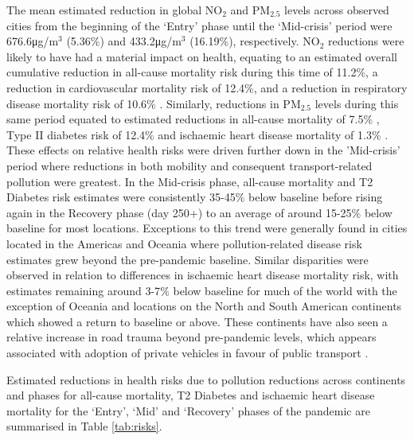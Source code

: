 \documentclass[preprint,12pt]{elsarticle}
\begin{document}
The mean estimated reduction in global NO$_{2}$ and PM$_{2.5}$ levels across observed cities from the beginning of the `Entry' phase until the `Mid-crisis' period were 676.6\si{\micro\gram}/m$^{3}$ (5.36\%) and 433.2\si{\micro\gram}/m$^{3}$ (16.19\%), respectively. NO$_{2}$ reductions were likely to have had a material impact on health, equating to an estimated overall cumulative reduction in all-cause mortality risk during this time of 11.2\%, a reduction in cardiovascular mortality risk of 12.4\%, and a reduction in respiratory disease mortality risk of 10.6\% \cite{Huang19Pollution}. Similarly, reductions in PM$_{2.5}$ levels during this same period equated to estimated reductions in all-cause mortality of 7.5\% \cite{Yu2020PM2.5}, Type II diabetes risk of 12.4\% and ischaemic heart disease mortality of 1.3\% \cite{Xie257}. These effects on relative health risks were driven further down in the 'Mid-crisis' period where reductions in both mobility and consequent transport-related pollution were greatest. In the Mid-crisis phase, all-cause mortality and T2 Diabetes risk estimates were consistently 35-45$\%$ below baseline before rising again in the Recovery phase (day 250+) to an average of around 15-25$\%$ below baseline for most locations. Exceptions to this trend were generally found in cities located in the Americas and Oceania where pollution-related disease risk estimates grew beyond the pre-pandemic baseline. Similar disparities were observed in relation to differences in ischaemic heart disease mortality risk, with estimates remaining around 3-7$\%$ below baseline for much of the world with the exception of Oceania and locations on the North and South American continents which showed a return to baseline or above. These continents have also seen a relative increase in road trauma beyond pre-pandemic levels, which appears associated with adoption of private vehicles in favour of public transport \cite{ITFRS, saladie2023back, DAS20211}. 


Estimated reductions in health risks due to pollution reductions across continents and phases for all-cause mortality, T2 Diabetes and ischaemic heart disease mortality for the `Entry', `Mid' and `Recovery' phases of the pandemic are summarised in Table \ref{tab:risks}. 
\end{document}
